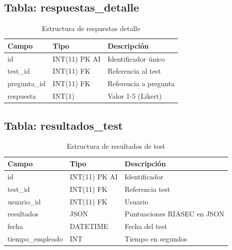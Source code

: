 \documentclass[12pt, a4paper]{report}
\begin{document}
\subsection{Tabla: respuestas\_detalle}
\begin{table}[H]
\centering
\begin{tabularx}{\textwidth}{|l|X|l|}
\hline
\textbf{Campo} & \textbf{Tipo} & \textbf{Descripción} \\
\hline
id & INT(11) PK AI & Identificador único \\
test\_id & INT(11) FK & Referencia al test \\
pregunta\_id & INT(11) FK & Referencia a pregunta \\
respuesta & INT(1) & Valor 1-5 (Likert) \\
\hline
\end{tabularx}
\caption{Estructura de respuestas detalle}
\end{table}

\subsection{Tabla: resultados\_test}
\begin{table}[H]
\centering
\begin{tabularx}{\textwidth}{|l|X|l|}
\hline
\textbf{Campo} & \textbf{Tipo} & \textbf{Descripción} \\
\hline
id & INT(11) PK AI & Identificador \\
test\_id & INT(11) FK & Referencia test \\
usuario\_id & INT(11) FK & Usuario \\
resultados & JSON & Puntuaciones RIASEC en JSON \\
fecha & DATETIME & Fecha del test \\
tiempo\_empleado & INT & Tiempo en segundos \\
\hline
\end{tabularx}
\caption{Estructura de resultados de test}
\end{table}
\end{document}

